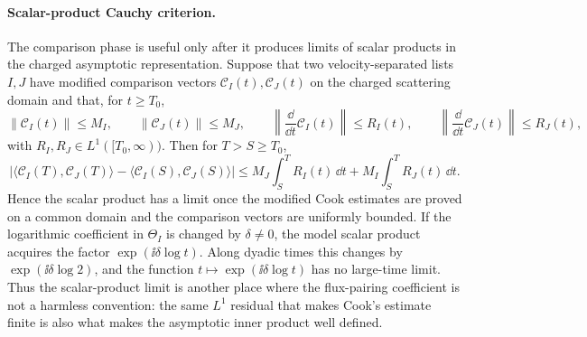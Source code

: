 \paragraph{Scalar-product Cauchy criterion.}
The comparison phase is useful only after it produces limits of scalar
products in the charged asymptotic representation.  Suppose that two
velocity-separated lists \(I,J\) have modified comparison vectors
\(\mathcal C_I(t),\mathcal C_J(t)\) on the charged scattering domain and
that, for \(t\ge T_0\),
\[
  \|\mathcal C_I(t)\|\le M_I,\qquad
  \|\mathcal C_J(t)\|\le M_J,\qquad
  \left\|\frac{\dd}{\dd t}\mathcal C_I(t)\right\|\le R_I(t),\qquad
  \left\|\frac{\dd}{\dd t}\mathcal C_J(t)\right\|\le R_J(t),
\]
with \(R_I,R_J\in L^1([T_0,\infty))\).  Then for \(T>S\ge T_0\),
\begin{equation}
  \left|
    \langle\mathcal C_I(T),\mathcal C_J(T)\rangle
    -
    \langle\mathcal C_I(S),\mathcal C_J(S)\rangle
  \right|
  \le
  M_J\int_S^T R_I(t)\,\dd t
  +
  M_I\int_S^T R_J(t)\,\dd t .
  \label{eq:charged-scalar-product-cauchy-bound}
\end{equation}
Hence the scalar product has a limit once the modified Cook estimates are
proved on a common domain and the comparison vectors are uniformly bounded.
If the logarithmic coefficient in \(\Theta_I\) is changed by
\(\delta\neq0\), the model scalar product acquires the factor
\(\exp(\ii\delta\log t)\).  Along dyadic times this changes by
\(\exp(\ii\delta\log2)\), and the function
\(t\mapsto\exp(\ii\delta\log t)\) has no large-time limit.  Thus the
scalar-product limit is another place where the flux-pairing coefficient is
not a harmless convention: the same \(L^1\) residual that makes Cook's
estimate finite is also what makes the asymptotic inner product well
defined.

